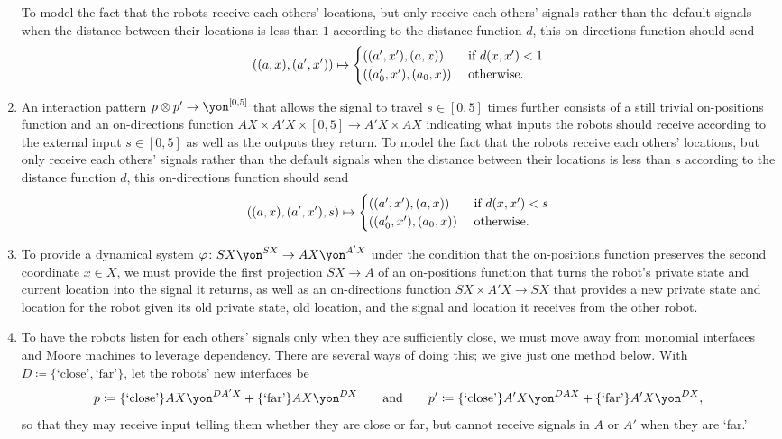 \documentclass[Book-Poly]{subfiles}
\begin{document}
\begin{exercise}
\begin{solution}
\begin{enumerate}
    To model the fact that the robots receive each others' locations, but only receive each others' signals rather than the default signals when the distance between their locations is less than $1$ according to the distance function $d$, this on-directions function should send
    \[
        ((a,x),(a',x'))\mapsto
          \begin{cases}
          	((a',x'),(a,x))&\textnormal{ if }d(x,x')<1\\
          	((a'_0,x'),(a_0,x))&\textnormal{ otherwise}.
          \end{cases}
    \]
    \item An interaction pattern $p\otimes p'\to\yon^{[0,5]}$ that allows the signal to travel $s\in[0,5]$ times further consists of a still trivial on-positions function and an on-directions function $AX\times A'X\times[0,5]\to A'X\times AX$ indicating what inputs the robots should receive according to the external input $s\in[0,5]$ as well as the outputs they return.
    To model the fact that the robots receive each others' locations, but only receive each others' signals rather than the default signals when the distance between their locations is less than $s$ according to the distance function $d$, this on-directions function should send
    \[
        ((a,x),(a',x'),s)\mapsto
          \begin{cases}
          	((a',x'),(a,x))&\textnormal{ if }d(x,x')<s\\
          	((a'_0,x'),(a_0,x))&\textnormal{ otherwise}.
          \end{cases}
    \]
    \item To provide a dynamical system $\varphi\colon SX\yon^{SX}\to AX\yon^{A'X}$ under the condition that the on-positions function preserves the second coordinate $x\in X$, we must provide the first projection $SX\to A$ of an on-positions function that turns the robot's private state and current location into the signal it returns, as well as an on-directions function $SX\times A'X\to SX$ that provides a new private state and location for the robot given its old private state, old location, and the signal and location it receives from the other robot.
    
    \item To have the robots listen for each others' signals only when they are sufficiently close, we must move away from monomial interfaces and Moore machines to leverage dependency.
    There are several ways of doing this; we give just one method below.
    With $D\coloneqq\{\text{`close'},\text{`far'}\}$, let the robots' new interfaces be
    \[
        p\coloneqq \{\text{`close'}\}AX\yon^{DA'X}+\{\text{`far'}\}AX\yon^{DX} \qqand p'\coloneqq \{\text{`close'}\}A'X\yon^{DAX}+\{\text{`far'}\}A'X\yon^{DX},
    \]
    so that they may receive input telling them whether they are close or far, but cannot receive signals in $A$ or $A'$ when they are `far.'
    

\end{enumerate}
\end{solution}
\end{exercise}
\end{document}
